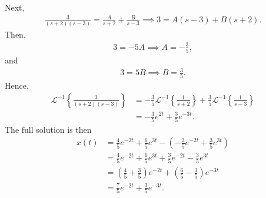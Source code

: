 \documentclass{report}
\begin{document}
    Next, 
    \begin{align*}
        \frac{3}{(s+2)(s-3)} = \frac{A}{s+2} + \frac{B}{s-3} \implies 3 = A(s-3) + B(s+2)
    .\end{align*}
    Then,
    \begin{align*}
        3 = -5A \implies A = -\frac{3}{5}
    ,\end{align*}
    and 
    \begin{align*}
        3 = 5B \implies B = \frac{3}{5}
    .\end{align*}
    Hence,
    \begin{align*}
        \mathcal{L}^{-1}\left\{\frac{3}{(s+2)(s-3)}\right\} &= -\frac{3}{5}\mathcal{L}^{-1}\left\{\frac{1}{s+2}\right\} + \frac{3}{5}\mathcal{L}^{-1}\left\{\frac{1}{s-3}\right\} \\
        &=-\frac{3}{5}e^{2t} + \frac{3}{5}e^{-3t}
    .\end{align*}
    The full solution is then
    \begin{align*}
        x(t) &= \frac{4}{5}e^{-2t} + \frac{6}{5}e^{3t}  - \left(-\frac{3}{5}e^{-2t} + \frac{3}{5}e^{3t}\right) \\
        &= \frac{4}{5}e^{-2t} + \frac{6}{5}e^{3t}  + \frac{3}{5}e^{-2t} - \frac{3}{5}e^{3t} \\
        &= \left(\frac{4}{5} + \frac{3}{5}\right)e^{-2t} + \left(\frac{6}{5}-\frac{3}{5}\right)e^{-3t} \\
        &= \frac{7}{5}e^{-2t} + \frac{3}{5}e^{-3t}
    .\end{align*}
\end{document}
